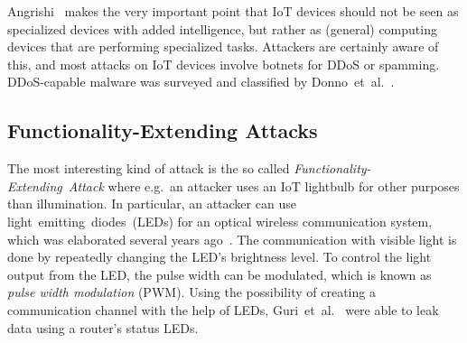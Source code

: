 Angrishi~\cite{Angrishi:2017:TitiiiviIb} makes the very important point that IoT devices should not be seen as specialized devices with added intelligence, but rather as (general) computing devices that are performing specialized tasks.
Attackers are certainly aware of this, and most attacks on IoT devices involve botnets for DDoS or spamming. DDoS-capable malware was surveyed and classified by Donno~et~al.~\cite{Donno:2017:ADIM}.




\subsection{Functionality-Extending Attacks}
\label{sec:functionality_extending_attacks}
The most interesting kind of attack is the so called \textit{Functionality-Extending~Attack} where e.g.\ an attacker uses an IoT lightbulb for other purposes than illumination.
In particular, an attacker can use light~emitting~diodes~(LEDs) for an optical wireless communication system, which was elaborated several years ago~\cite{Komine:2004:FAfVLCSuLL, Elgala:2007:OVLWCBoWL}. 
The communication with visible light is done by repeatedly changing the LED's brightness level. To control the light output from the LED, the pulse width can be modulated, which is known as \textit{pulse width modulation} (PWM).  
Using the possibility of creating a communication channel with the help of LEDs, Guri~et~al.~\cite{Guri:2017:xCDEANvRL} were able to leak data using a router's status LEDs.

